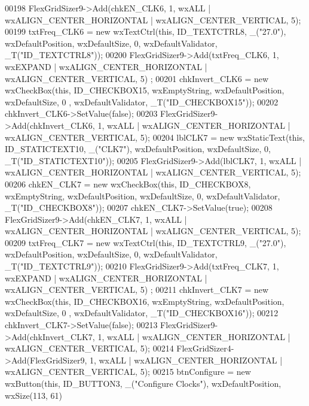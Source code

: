 \begin{DoxyCode}
00198     FlexGridSizer9->Add(chkEN\_CLK6, 1, wxALL | wxALIGN\_CENTER\_HORIZONTAL | wxALIGN\_CENTER\_VERTICAL, 5);
00199     txtFreq\_CLK6 = \textcolor{keyword}{new} wxTextCtrl(\textcolor{keyword}{this}, ID\_TEXTCTRL8, \_(\textcolor{stringliteral}{"27.0"}), wxDefaultPosition, wxDefaultSize, 0, 
      wxDefaultValidator, _T(\textcolor{stringliteral}{"ID\_TEXTCTRL8"}));
00200     FlexGridSizer9->Add(txtFreq\_CLK6, 1, wxEXPAND | wxALIGN\_CENTER\_HORIZONTAL | wxALIGN\_CENTER\_VERTICAL, 5)
      ;
00201     chkInvert\_CLK6 = \textcolor{keyword}{new} wxCheckBox(\textcolor{keyword}{this}, ID\_CHECKBOX15, wxEmptyString, wxDefaultPosition, wxDefaultSize, 0
      , wxDefaultValidator, _T(\textcolor{stringliteral}{"ID\_CHECKBOX15"}));
00202     chkInvert\_CLK6->SetValue(\textcolor{keyword}{false});
00203     FlexGridSizer9->Add(chkInvert\_CLK6, 1, wxALL | wxALIGN\_CENTER\_HORIZONTAL | wxALIGN\_CENTER\_VERTICAL, 5);
00204     lblCLK7 = \textcolor{keyword}{new} wxStaticText(\textcolor{keyword}{this}, ID\_STATICTEXT10, \_(\textcolor{stringliteral}{"CLK7"}), wxDefaultPosition, wxDefaultSize, 0, 
      _T(\textcolor{stringliteral}{"ID\_STATICTEXT10"}));
00205     FlexGridSizer9->Add(lblCLK7, 1, wxALL | wxALIGN\_CENTER\_HORIZONTAL | wxALIGN\_CENTER\_VERTICAL, 5);
00206     chkEN\_CLK7 = \textcolor{keyword}{new} wxCheckBox(\textcolor{keyword}{this}, ID\_CHECKBOX8, wxEmptyString, wxDefaultPosition, wxDefaultSize, 0, 
      wxDefaultValidator, _T(\textcolor{stringliteral}{"ID\_CHECKBOX8"}));
00207     chkEN\_CLK7->SetValue(\textcolor{keyword}{true});
00208     FlexGridSizer9->Add(chkEN\_CLK7, 1, wxALL | wxALIGN\_CENTER\_HORIZONTAL | wxALIGN\_CENTER\_VERTICAL, 5);
00209     txtFreq\_CLK7 = \textcolor{keyword}{new} wxTextCtrl(\textcolor{keyword}{this}, ID\_TEXTCTRL9, \_(\textcolor{stringliteral}{"27.0"}), wxDefaultPosition, wxDefaultSize, 0, 
      wxDefaultValidator, _T(\textcolor{stringliteral}{"ID\_TEXTCTRL9"}));
00210     FlexGridSizer9->Add(txtFreq\_CLK7, 1, wxEXPAND | wxALIGN\_CENTER\_HORIZONTAL | wxALIGN\_CENTER\_VERTICAL, 5)
      ;
00211     chkInvert\_CLK7 = \textcolor{keyword}{new} wxCheckBox(\textcolor{keyword}{this}, ID\_CHECKBOX16, wxEmptyString, wxDefaultPosition, wxDefaultSize, 0
      , wxDefaultValidator, _T(\textcolor{stringliteral}{"ID\_CHECKBOX16"}));
00212     chkInvert\_CLK7->SetValue(\textcolor{keyword}{false});
00213     FlexGridSizer9->Add(chkInvert\_CLK7, 1, wxALL | wxALIGN\_CENTER\_HORIZONTAL | wxALIGN\_CENTER\_VERTICAL, 5);
00214     FlexGridSizer4->Add(FlexGridSizer9, 1, wxALL | wxALIGN\_CENTER\_HORIZONTAL | wxALIGN\_CENTER\_VERTICAL, 5);
00215     btnConfigure = \textcolor{keyword}{new} wxButton(\textcolor{keyword}{this}, ID\_BUTTON3, \_(\textcolor{stringliteral}{"Configure Clocks"}), wxDefaultPosition, wxSize(113, 61)

\end{DoxyCode}
